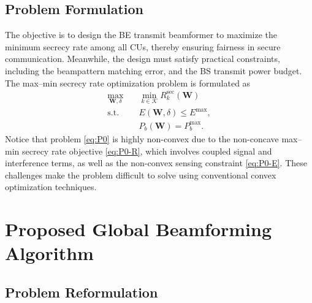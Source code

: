 \documentclass[runningheads]{llncs}
\begin{document}
\subsection{Problem Formulation} 
The objective is to design the BE transmit beamformer to maximize the minimum secrecy rate among all CUs, thereby ensuring fairness in secure communication. Meanwhile, the design must satisfy practical constraints, including the beampattern matching error, and the BS transmit power budget.
The max--min secrecy rate optimization problem is formulated as
\begin{subequations}
\label{eq:P0}
\begin{align}
\max_{\mathbf{W}, \delta} \quad & \min_{k \in \mathcal{K}} R^{\mathrm{sec}}_k(\mathbf{W}) \label{eq:P0-R} \\
\text{s.t.} \quad 
     & E(\mathbf{W}, \delta) \leq E^{\max}, \label{eq:P0-E} \\
     & P_{{b}}(\mathbf{W}) = P_b^{\max}. \label{eq:P0-P}
\end{align}
\end{subequations}
Notice that problem \eqref{eq:P0} is highly non-convex due to the non-concave max--min secrecy rate objective \eqref{eq:P0-R}, which involves coupled signal and interference terms, as well as the non-convex sensing constraint \eqref{eq:P0-E}. These challenges make the problem difficult to solve using conventional convex optimization techniques.


\section{Proposed Global Beamforming Algorithm}

\subsection{Problem Reformulation}
\end{document}
